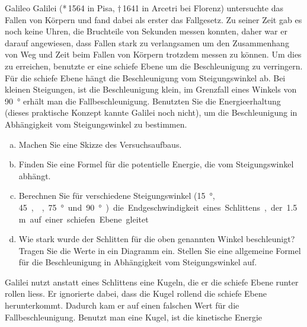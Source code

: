 
\begin{aufgabe}
	Galileo Galilei (*\,1564 in Pisa, $\dagger$\,1641 in Arcetri bei Florenz) untersuchte das Fallen von Körpern 
	und fand dabei als erster das Fallgesetz.
	Zu seiner Zeit gab es noch keine Uhren, die Bruchteile von Sekunden messen konnten, daher war er darauf angewiesen,
	dass Fallen stark zu verlangsamen um den Zusammenhang von Weg und Zeit beim Fallen von Körpern trotzdem messen zu können.
	Um dies zu erreichen, benutzte er eine schiefe Ebene um die Beschleunigung zu verringern.
	Für die schiefe Ebene hängt die Beschleunigung vom Steigungswinkel ab. 
	Bei kleinen Steigungen, ist die Beschleunigung klein,
	im Grenzfall eines Winkels von \SI{90}{\degree} erhält man die Fallbeschleunigung.
	Benutzten Sie die Energieerhaltung (dieses praktische Konzept kannte Galilei noch nicht),
	um die Beschleunigung in Abhängigkeit vom Steigungswinkel zu bestimmen.
	\begin{enumerate} [a)]
		\item Machen Sie eine Skizze des Versuchsaufbaus.
		\item Finden Sie eine Formel für die potentielle Energie, die vom Steigungswinkel abhängt.
		\item Berechnen Sie für verschiedene Steigungswinkel (\SI{15}{\degree}, \SI{45}, {\degree}, \SI{75}{\degree} und \SI{90}{\degree}) 
			die Endgeschwindigkeit eines Schlittens, der \SI{1.5}{m} auf einer schiefen Ebene gleitet.
		\item Wie stark wurde der Schlitten für die oben genannten Winkel beschleunigt? Tragen Sie die Werte in ein Diagramm ein. 
			Stellen Sie eine allgemeine	Formel für die Beschleunigung in Abhängigkeit vom Steigungswinkel auf.
	\end{enumerate}
	Galilei nutzt anstatt eines Schlittens eine Kugeln, die er die schiefe Ebene runter rollen liess. Er ignorierte dabei, dass die Kugel rollend
	die schiefe Ebene herunterkommt. Dadurch kam er auf einen falschen Wert für die Fallbeschleunigung. Benutzt man eine Kugel, ist die kinetische Energie

\end{aufgabe}
